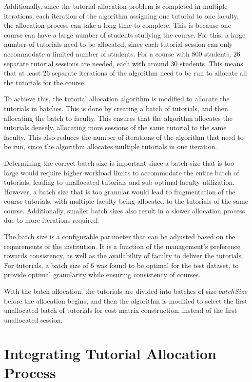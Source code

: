 Additionally, since the tutorial allocation problem is completed in multiple iterations, each iteration of the algorithm assigning one tutorial to one faculty, the allocation process can take a long time to complete. This is because one course can have a large number of students studying the course. For this, a large number of tutorials need to be allocated, since each tutorial session can only accommodate a limited number of students. For a course with 800 students, 26 separate tutorial sessions are needed, each with around 30 students. This means that at least 26 separate iterations of the algorithm need to be run to allocate all the tutorials for the course.

To achieve this, the tutorial allocation algorithm is modified to allocate the tutorials in batches. This is done by creating a batch of tutorials, and then allocating the batch to faculty. This ensures that the algorithm allocates the tutorials densely, allocating more sessions of the same tutorial to the same faculty. This also reduces the number of iterations of the algorithm that need to be run, since the algorithm allocates multiple tutorials in one iteration.

Determining the correct batch size is important since a batch size that is too large would require higher workload limits to accommodate the entire batch of tutorials, leading to unallocated tutorials and sub-optimal faculty utilization. However, a batch size that is too granular would lead to fragmentation of the course tutorials, with multiple faculty being allocated to the tutorials of the same course. Additionally, smaller batch sizes also result in a slower allocation process due to more iterations required.

The batch size is a configurable parameter that can be adjusted based on the requirements of the institution. It is a function of the management's preference towards consistency, as well as the availability of faculty to deliver the tutorials. For tutorials, a batch size of 6 was found to be optimal for the test dataset, to provide optimal granularity while ensuring consistency of courses.

With the batch allocation, the tutorials are divided into batches of size $batchSize$ before the allocation begins, and then the algorithm is modified to select the first unallocated batch of tutorials for cost matrix construction, instead of the first unallocated session.


\section{Integrating Tutorial Allocation Process}

